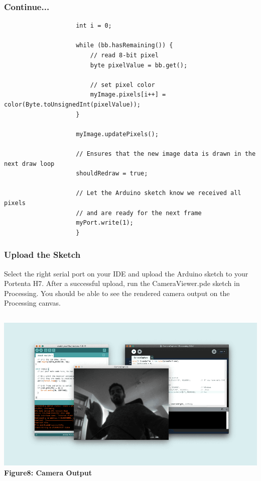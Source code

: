 \documentclass[10pt, a4paper]{beamer}
\begin{document}
			\begin{frame}[fragile]
				\frametitle{Continue...}
				\begin{lstlisting}
					int i = 0;
					
					while (bb.hasRemaining()) {
						// read 8-bit pixel
						byte pixelValue = bb.get();
						
						// set pixel color
						myImage.pixels[i++] = color(Byte.toUnsignedInt(pixelValue));    
					}
					
					myImage.updatePixels();
					
					// Ensures that the new image data is drawn in the next draw loop
					shouldRedraw = true;
					
					// Let the Arduino sketch know we received all pixels
					// and are ready for the next frame
					myPort.write(1);
					} 
			\end{lstlisting}
		\end{frame}
	
	\begin{frame}		
		\frametitle{Upload the Sketch}
			Select the right serial port on your IDE and upload the Arduino sketch to your Portenta H7. After a successful upload, run the CameraViewer.pde sketch in Processing. You should be able to see the rendered camera output on the Processing canvas.		
				\begin{columns}
					\centering
					\includegraphics[width=\textwidth]{images/Camera Output.png}
					\vspace{0.2cm}
					\textbf{Figure8: Camera Output}
				\end{columns}

	\end{frame}
		
	
\end{document}
